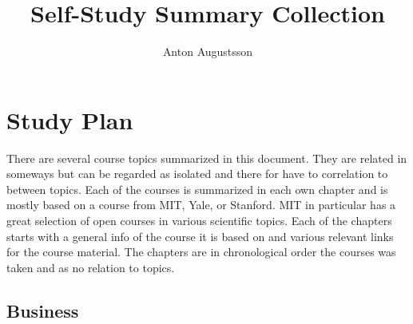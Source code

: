 \documentclass{book}
\title{Self-Study Summary Collection}
\author{Anton Augustsson}
\begin{document}
\maketitle
\newpage
\tableofcontents
\newpage



\chapter{Study Plan}
There are several course topics summarized in this document.
They are related in someways but can be regarded as isolated and there for have to correlation to between topics.
Each of the courses is summarized in each own chapter and is mostly based on a course from MIT, Yale, or Stanford.
MIT in particular has a great selection of open courses in various scientific topics. Each of the chapters starts
with a general info of the course it is based on and various relevant links for the course material.
The chapters are in chronological order the courses was taken and as no relation to topics.
\newpage

\section{Business}
\resizebox{0.9\textwidth}{!}{} \newpage



\newcommand{\pathBU}{../../chapters/Business}

\newcommand{\pathAUD}{\pathBU/Auditing-and-Assurance}  \newpage
\newcommand{\pathISC}{\pathBU/Information-and-System-Control}  \newpage
\newcommand{\pathFAR}{\pathBU/Financial-Accounting-and-Reporting}  \newpage
\newcommand{\pathBAR}{\pathBU/Business-Analysis-and-Reporting}  \newpage
\newcommand{\pathREG}{\pathBU/Taxation-and-Regulation}  \newpage
\newcommand{\pathTCP}{\pathBU/Tax-Complience-and-Planning}  \newpage

\newcommand{\pathCFSFM}{\pathBU/Corporate-Finance-and-Strategic-Financial-Management}  \newpage
\newcommand{\pathSMBP}{\pathBU/Strategic-Management-and-Business-Policy}  \newpage
\newcommand{\pathOSCM}{\pathBU/Operations-and-Supply-Chain-Management}  \newpage
\newcommand{\pathGBIM}{\pathBU/Global-Business-and-International-Management}  \newpage
\end{document}
